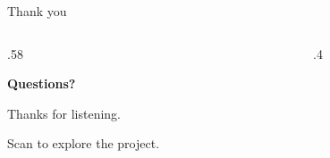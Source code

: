 \documentclass[aspectratio=169,11pt]{beamer}
\begin{document}
\begin{frame}{Thank you}
\begin{columns}[c,onlytextwidth]
\begin{column}{.58\textwidth}
{\LARGE\bfseries\color{ink}Questions?\par}
\bigskip
{\large Thanks for listening.\par}
\medskip
{\color{teal}Scan to explore the project.}
\end{column}
\begin{column}{.4\textwidth}
\centering
\resizebox{4.6cm}{!}{}
\end{column}
\end{columns}
\end{frame}
\end{document}
